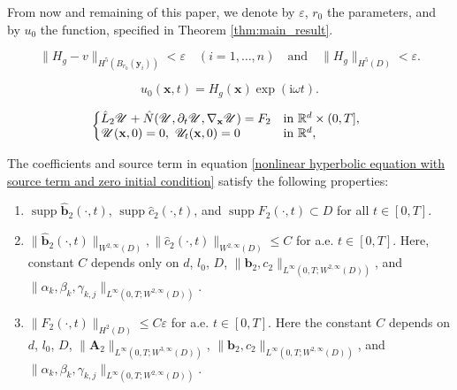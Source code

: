 \documentclass[10pt,a4paper]{amsart}
\begin{document}
	\begin{remark}\label{cf 3.5}
		From now and remaining of this paper, we denote by $\varepsilon$, $r_0$ the parameters, and by $u_0$ the function, specified in Theorem \ref{thm:main_result}.
	\end{remark}

		\begin{equation}\label{important estimate for H_g}
			\| H_g - v \|_{H^5(B_{r_0}(\mathbf{y}_i))} < \varepsilon \quad (i=1,\dots,n) \quad \text{and} \quad \| H_g \|_{H^5(D)} < \varepsilon.
		\end{equation}

		\begin{equation}\label{u_0}
			u_0(\mathbf{x},t) = H_g(\mathbf{x}) \exp(\mathrm{i} \omega t).
		\end{equation}

	\begin{equation}\label{nonlinear hyperbolic equation with source term and zero initial condition}
		\left\{
		\begin{array}{@{}l@{\quad}l}
			\hat{L}_2 \mathscr{U} + \hat{N}(\mathscr{U}, \partial_t \mathscr{U}, \nabla_\mathbf{x} \mathscr{U}) = F_2 & \text{in } \mathbb{R}^d \times (0,T], \\
			\mathscr{U}(\mathbf{x},0) = 0,\ \mathscr{U}_t(\mathbf{x},0) = 0 & \text{in } \mathbb{R}^{d},
		\end{array}
		\right.
	\end{equation}

	\begin{lemma}\label{Lemma 5.1}
		The coefficients and source term in equation \eqref{nonlinear hyperbolic equation with source term and zero initial condition} satisfy the following properties:
		\begin{enumerate}
			\item $\operatorname{supp} \hat{\mathbf{b}}_2(\cdot, t)$, $\operatorname{supp} \hat{c}_2(\cdot, t)$, and $\operatorname{supp} F_2(\cdot, t) \subset D$ for all $t \in [0, T]$.
			\item 
			$
			\|\hat{\mathbf{b}}_2(\cdot, t)\|_{W^{2,\infty}(D)}, \|\hat{c}_2(\cdot, t)\|_{W^{2,\infty}(D)}\leqslant C
			$ for a.e. $t \in [0, T]$.
			Here, constant $C$ depends only on $d$, $l_0$, $D$, $\|\mathbf{b}_2, c_2\|_{L^{\infty}(0,T; W^{2,\infty}(D))}$, and $\| \alpha_k, \beta_k, \gamma_{k,j}\|_{L^{\infty}(0,T; W^{2,\infty}(D))}$.
			\item $
			\|F_2(\cdot, t)\|_{H^{2}(D)} \leqslant C \varepsilon$ 
			for a.e. $t \in [0, T]$. Here the constant $C$ depends on $d$, $l_0$, $D$, $\|\mathbf{A}_2\|_{L^{\infty}(0,T; W^{3,\infty}(D))}$, $\|\mathbf{b}_2, c_2\|_{L^{\infty}(0,T; W^{2,\infty}(D))}$, and $\|\alpha_k, \beta_k, \gamma_{k,j}\|_{L^{\infty}(0,T; W^{2,\infty}(D))}$.
		\end{enumerate}
	\end{lemma}
\end{document}
